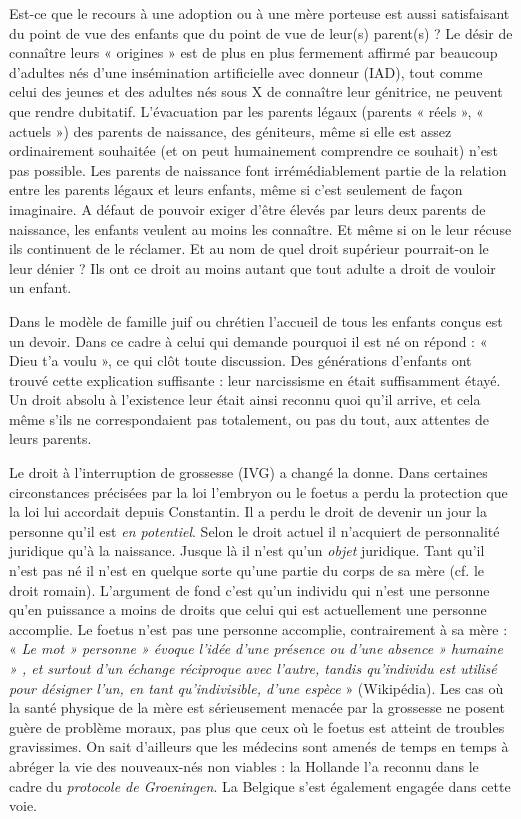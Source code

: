  Est-ce que le recours à une adoption ou à une mère porteuse est aussi satisfaisant du point de vue des enfants que du point de vue de leur(s) parent(s) ? Le désir de connaître leurs « origines » est de plus en plus fermement affirmé par beaucoup d'adultes nés d'une insémination artificielle avec donneur (IAD), tout comme celui des jeunes et des adultes nés sous X de connaître leur génitrice, ne peuvent que rendre dubitatif. L'évacuation par les parents légaux (parents « réels », « actuels ») des parents de naissance, des géniteurs, même si elle est assez ordinairement souhaitée (et on peut humainement comprendre ce souhait) n'est pas possible. Les parents de naissance font irrémédiablement partie de la relation entre les parents légaux et leurs enfants, même si c'est seulement de façon imaginaire. A défaut de pouvoir exiger d'être élevés par leurs deux parents de naissance, les enfants veulent au moins les connaître. Et même si on le leur récuse ils continuent de le réclamer. Et au nom de quel droit supérieur pourrait-on le leur dénier ? Ils ont ce droit au moins autant que tout adulte a droit de vouloir un enfant. 
 
 Dans le modèle de famille juif ou chrétien l'accueil de tous les enfants conçus est un devoir. Dans ce cadre à celui qui demande pourquoi il est né on répond : « Dieu t'a voulu », ce qui clôt toute discussion. Des générations d'enfants ont trouvé cette explication suffisante : leur narcissisme en était suffisamment étayé. Un droit absolu à l'existence leur était ainsi reconnu quoi qu'il arrive, et cela même s'ils ne correspondaient pas totalement, ou pas du tout, aux attentes de leurs parents.
  
 Le droit à l'interruption de grossesse (IVG) a changé la donne. Dans certaines circonstances précisées par la loi l'embryon ou le foetus a perdu la protection que la loi lui accordait depuis Constantin. Il a perdu le droit de devenir un jour la personne qu'il est \emph{en potentiel}. Selon le droit actuel il n'acquiert de personnalité juridique qu'à la naissance. Jusque là il n'est qu'un \emph{objet} juridique. Tant qu'il n'est pas né il n'est en quelque sorte qu'une partie du corps de sa mère (cf. le droit romain). L'argument de fond c'est qu'un individu qui n'est une personne qu'en puissance a moins de droits que celui qui est actuellement une personne accomplie. Le foetus n'est pas une personne accomplie, contrairement à sa mère : « \emph{Le mot » personne » évoque l'idée d'une présence ou d'une absence » humaine » , et surtout d'un échange réciproque avec l'autre, tandis qu'individu est utilisé pour désigner l'un, en tant qu'indivisible, d'une espèce} » (Wikipédia). 
 Les cas où la santé physique de la mère est sérieusement menacée par la grossesse ne posent guère de problème moraux, pas plus que ceux où le foetus est atteint de troubles gravissimes. On sait d'ailleurs que les médecins sont amenés de temps en temps à abréger la vie des nouveaux-nés non viables : la Hollande l'a reconnu dans le cadre du \emph{protocole de Groeningen}. La Belgique s'est également engagée dans cette voie. 
 
